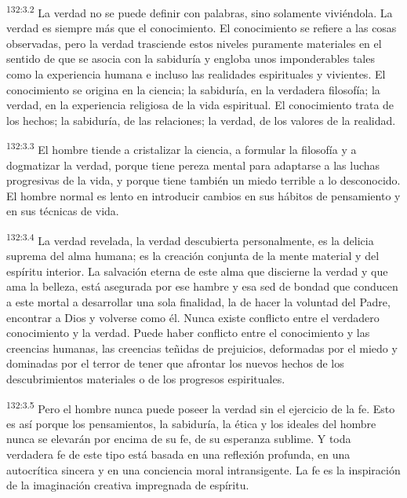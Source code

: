 \par
\textsuperscript{132:3.2} La verdad no se puede definir con palabras, sino solamente viviéndola. La verdad es siempre más que el conocimiento. El conocimiento se refiere a las cosas observadas, pero la verdad trasciende estos niveles puramente materiales en el sentido de que se asocia con la sabiduría y engloba unos imponderables tales como la experiencia humana e incluso las realidades espirituales y vivientes. El conocimiento se origina en la ciencia; la sabiduría, en la verdadera filosofía; la verdad, en la experiencia religiosa de la vida espiritual. El conocimiento trata de los hechos; la sabiduría, de las relaciones; la verdad, de los valores de la realidad.

\par
\textsuperscript{132:3.3} El hombre tiende a cristalizar la ciencia, a formular la filosofía y a dogmatizar la verdad, porque tiene pereza mental para adaptarse a las luchas progresivas de la vida, y porque tiene también un miedo terrible a lo desconocido. El hombre normal es lento en introducir cambios en sus hábitos de pensamiento y en sus técnicas de vida.

\par
\textsuperscript{132:3.4} La verdad revelada, la verdad descubierta personalmente, es la delicia suprema del alma humana; es la creación conjunta de la mente material y del espíritu interior. La salvación eterna de este alma que discierne la verdad y que ama la belleza, está asegurada por ese hambre y esa sed de bondad que conducen a este mortal a desarrollar una sola finalidad, la de hacer la voluntad del Padre, encontrar a Dios y volverse como él. Nunca existe conflicto entre el verdadero conocimiento y la verdad. Puede haber conflicto entre el conocimiento y las creencias humanas, las creencias teñidas de prejuicios, deformadas por el miedo y dominadas por el terror de tener que afrontar los nuevos hechos de los descubrimientos materiales o de los progresos espirituales.

\par
\textsuperscript{132:3.5} Pero el hombre nunca puede poseer la verdad sin el ejercicio de la fe. Esto es así porque los pensamientos, la sabiduría, la ética y los ideales del hombre nunca se elevarán por encima de su fe, de su esperanza sublime. Y toda verdadera fe de este tipo está basada en una reflexión profunda, en una autocrítica sincera y en una conciencia moral intransigente. La fe es la inspiración de la imaginación creativa impregnada de espíritu.

